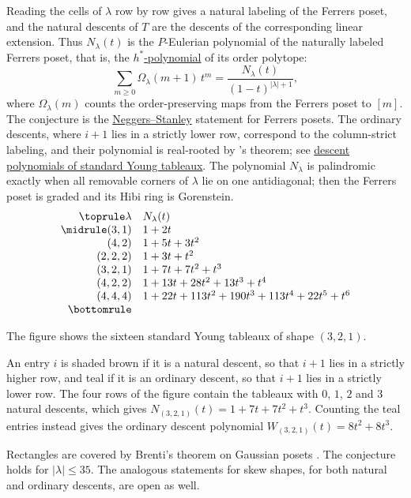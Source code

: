 Reading the cells of $\lambda$ row by row gives a natural labeling of the
Ferrers poset, and the natural descents of $T$ are the descents of the
corresponding linear extension.  Thus $N_\lambda(t)$ is the $P$-Eulerian
polynomial of the naturally labeled Ferrers poset, that is, the
\hyperref[hStarPolynomial]{$h^*$-polynomial} of its order polytope:
\[
  \sum_{m\geq0}\Omega_\lambda(m+1)\,t^m=\frac{N_\lambda(t)}{(1-t)^{|\lambda|+1}},
\]
where $\Omega_\lambda(m)$ counts the order-preserving maps from the Ferrers
poset to $[m]$.  The conjecture is the
\hyperref[neggersStanleyConjecture]{Neggers--Stanley} statement for Ferrers
posets.  The ordinary descents, where $i+1$ lies in a strictly lower row,
correspond to the column-strict labeling, and their polynomial is
real-rooted by 's theorem; see
\hyperref[sytDescentRealRooted]{descent polynomials of standard Young
tableaux}.  The polynomial $N_\lambda$ is palindromic exactly when all
removable corners of $\lambda$ lie on one antidiagonal; then the Ferrers
poset is graded and its Hibi ring is Gorenstein.
\[
\begin{array}{rl}
\toprule
\lambda & N_\lambda(t) \\
\midrule
(3,1) & 1+2t \\
(4,2) & 1+5t+3t^2 \\
(2,2,2) & 1+3t+t^2 \\
(3,2,1) & 1+7t+7t^2+t^3 \\
(4,2,2) & 1+13t+28t^2+13t^3+t^4 \\
(4,4,4) & 1+22t+113t^2+190t^3+113t^4+22t^5+t^6 \\
\bottomrule
\end{array}
\]
\begin{example*}[Natural descents for $\lambda=(3,2,1)$]
The figure shows the sixteen standard Young tableaux of shape $(3,2,1)$.
\begin{figure}
\end{figure}

An entry $i$ is shaded brown if it is a natural descent, so that $i+1$ lies in
a strictly higher row, and teal if it is an ordinary descent, so that $i+1$
lies in a strictly lower row.  The four rows of the figure contain the
tableaux with $0$, $1$, $2$ and $3$ natural descents, which gives
$N_{(3,2,1)}(t)=1+7t+7t^2+t^3$.  Counting the teal entries instead gives the
ordinary descent polynomial $W_{(3,2,1)}(t)=8t^2+8t^3$.
\end{example*}
Rectangles are covered by Brenti's theorem on Gaussian posets
\cite{Brenti1989}.  The conjecture holds for $|\lambda|\leq35$.  The analogous statements for skew shapes,
for both natural and ordinary descents, are open as well.


